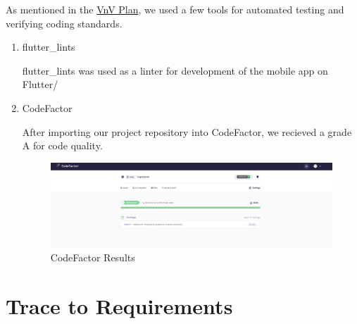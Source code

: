 \documentclass[12pt, titlepage]{article}
\begin{document}
As mentioned in the \href{https://github.com/NevoAbigail/Capstone/blob/main/docs/VnVPlan/VnVPlan.pdf}{VnV Plan}, we used a few tools for automated testing and verifying coding standards.

\begin{enumerate}

    \item flutter\_lints

    flutter\_lints was used as a linter for development of the mobile app on Flutter/

    \item CodeFactor

    After importing our project repository into CodeFactor, we recieved a grade A for code quality.

    \begin{figure}[h!]
    \centering
    \includegraphics[width=15cm]{CodeFactor}
    \caption{CodeFactor Results}
    \end{figure}


\end{enumerate}
		
\section{Trace to Requirements}
\end{document}
